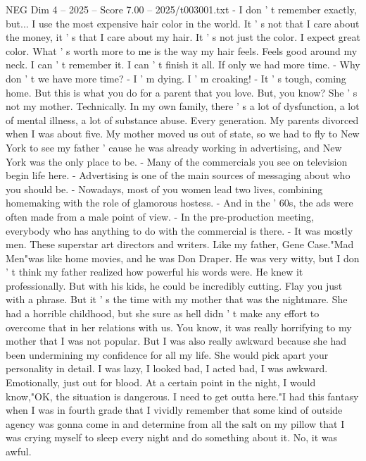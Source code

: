 \begin{textsample}{NEG Dim 4 – 2025 – Score 7.00 – 2025/t003001.txt}  \label{ex:f4_neg_081}
- I don ' t remember exactly, but...
I use the most expensive hair color in the world.
It ' s not that I care about the money, it ' s that I care about my hair.
It ' s not just the color.
I expect great color.
What ' s worth more to me is the way my hair feels.
Feels good around my neck.
I can ' t remember it.
I can ' t finish it all.
If only we had more time. - Why don ' t we have more time? - I ' m dying.
I ' m croaking! - It ' s tough, coming home.
But this is what you do for a parent that you love.
But, you know?
She ' s not my mother.
Technically.
In my own family, there ' s a lot of dysfunction, a lot of mental illness, a lot of substance abuse.
Every generation.
My parents divorced when I was about five.
My mother moved us out of state, so we had to fly to New York to see my father ' cause he was already working in advertising, and New York was the only place to be. - Many of the commercials you see on television begin life here. - Advertising is one of the main sources of messaging about who you should be. - Nowadays, most of you women lead two lives, combining homemaking with the role of glamorous hostess. - And in the ' 60s, the ads were often made from a male point of view. - In the pre-production meeting, everybody who has anything to do with the commercial is there. - It was mostly men.
These superstar art directors and writers.
Like my father, Gene Case."Mad Men"was like home movies, and he was Don Draper.
He was very witty, but I don ' t think my father realized how powerful his words were.
He knew it professionally.
But with his kids, he could be incredibly cutting.
Flay you just with a phrase.
But it ' s the time with my mother that was the nightmare.
She had a horrible childhood, but she sure as hell didn ' t make any effort to overcome that in her relations with us.
You know, it was really horrifying to my mother that I was not popular.
But I was also really awkward because she had been undermining my confidence for all my life.
She would pick apart your personality in detail.
I was lazy, I looked bad, I acted bad, I was awkward.
Emotionally, just out for blood.
At a certain point in the night, I would know,"OK, the situation is dangerous.
I need to get outta here."I had this fantasy when I was in fourth grade that I vividly remember that some kind of outside agency was gonna come in and determine from all the salt on my pillow that I was crying myself to sleep every night and do something about it.
No, it was awful.

\end{textsample}
